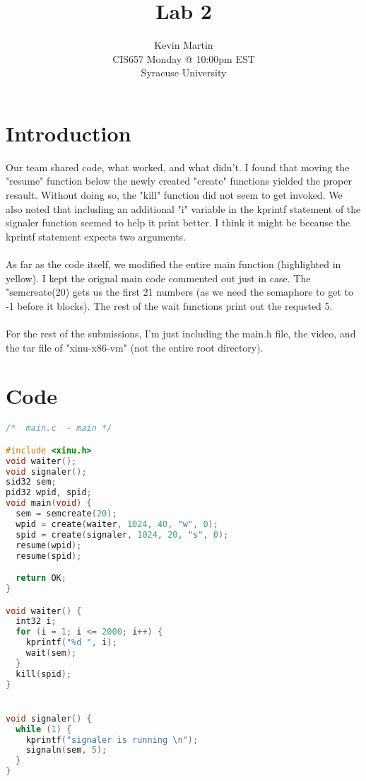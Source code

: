 \documentclass{article}
\author{Kevin Martin\\ CIS657 Monday @ 10:00pm EST\\ Syracuse University}
\title{Lab 2}
\begin{document}
\maketitle
\section{Introduction}
Our team shared code, what worked, and what didn't. I found that moving the
"resume" function below the newly created "create" functions yielded the
proper resault. Without doing so, the "kill" function did not seem to get
invoked. We also noted that including an additional "i" variable in the 
kprintf statement of the signaler function seemed to help it print better.
I think it might be because the kprintf statement expects two arguments.\\\\
As far as the code itself, we modified the entire main function (highlighted
in yellow). I kept the orignal main code commented out just in case. The 
"semcreate(20) gets us the first 21 numbers (as we need the semaphore to get
to -1 before it blocks). The rest of the wait functions print out the requsted 5.\\\\
For the rest of the submissions, I'm just including the main.h file, the video,
and the tar file of "xinu-x86-vm" (not the entire root directory).

\section{Code}

\begin{lstlisting}[language=c]
/*  main.c  - main */

#include <xinu.h>
void waiter();
void signaler();
sid32 sem;
pid32 wpid, spid;
void main(void) {
  sem = semcreate(20);
  wpid = create(waiter, 1024, 40, "w", 0);
  spid = create(signaler, 1024, 20, "s", 0);
  resume(wpid);
  resume(spid);

  return OK;
}

void waiter() {
  int32 i;
  for (i = 1; i <= 2000; i++) {
    kprintf("%d ", i);
    wait(sem);
  }
  kill(spid);
}


void signaler() {
  while (1) {
    kprintf("signaler is running \n");
    signaln(sem, 5);
  }
}
\end{lstlisting}
\end{document}

